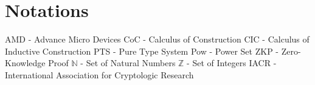 \chapter*{Notations}

AMD - Advance Micro Devices
CoC  - Calculus of Construction
CIC - Calculus of Inductive Construction
PTS - Pure Type System
Pow - Power Set
ZKP - Zero-Knowledge Proof
$\mathbb{N}$ - Set of Natural Numbers
$\mathbb{Z}$ - Set of Integers
IACR  - International Association for Cryptologic Research
